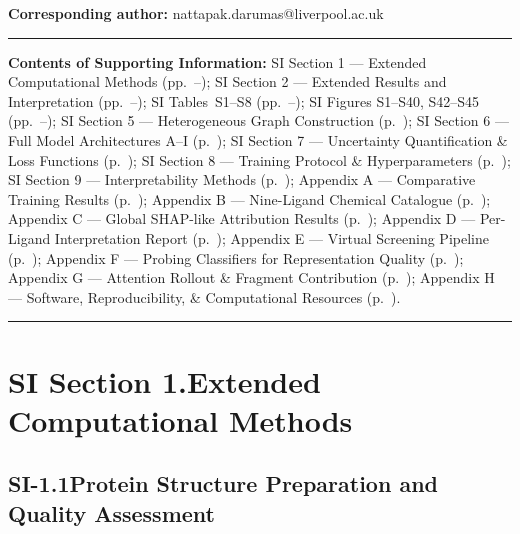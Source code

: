 \documentclass[11pt]{article}
\begin{document}
\vspace{4pt}
\noindent\textbf{Corresponding author:} nattapak.darumas@liverpool.ac.uk
\vspace{6pt}
\hrule
\vspace{8pt}
\noindent\textbf{Contents of Supporting Information:}
SI Section 1 --- Extended Computational Methods (pp.\ \pageref{si:methods}--\pageref{si:methods_end});
SI Section 2 --- Extended Results and Interpretation (pp.\ \pageref{si:results}--\pageref{si:results_end});
SI Tables~S1--S8 (pp.\ \pageref{si:tables}--\pageref{si:tables_end});
SI Figures S1--S40, S42--S45 (pp.\ \pageref{si:figures}--\pageref{si:figures_end});
SI Section 5 --- Heterogeneous Graph Construction (p.\ \pageref{si:graph});
SI Section 6 --- Full Model Architectures A--I (p.\ \pageref{si:models});
SI Section 7 --- Uncertainty Quantification \& Loss Functions (p.\ \pageref{si:uncertainty});
SI Section 8 --- Training Protocol \& Hyperparameters (p.\ \pageref{si:training});
SI Section 9 --- Interpretability Methods (p.\ \pageref{si:interpret});
Appendix A --- Comparative Training Results (p.\ \pageref{app:results});
Appendix B --- Nine-Ligand Chemical Catalogue (p.\ \pageref{app:ligands});
Appendix C --- Global SHAP-like Attribution Results (p.\ \pageref{app:shap});
Appendix D --- Per-Ligand Interpretation Report (p.\ \pageref{app:perligs});
Appendix E --- Virtual Screening Pipeline (p.\ \pageref{app:screen});
Appendix F --- Probing Classifiers for Representation Quality (p.\ \pageref{app:probing});
Appendix G --- Attention Rollout \& Fragment Contribution (p.\ \pageref{app:rollout});
Appendix H --- Software, Reproducibility, \& Computational Resources (p.\ \pageref{app:software}).
\vspace{6pt}
\hrule
\vspace{10pt}

\section*{SI Section 1.\quad Extended Computational Methods}
\label{si:methods}

\subsection*{SI-1.1\quad Protein Structure Preparation and Quality Assessment}
\end{document}
